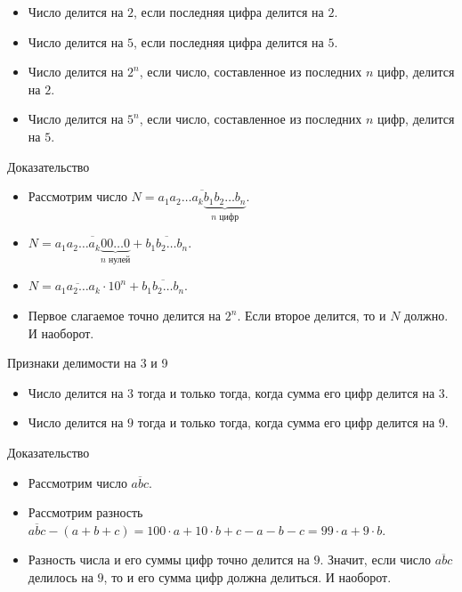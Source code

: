 \documentclass[17pt]{extarticle}
\newcommand{\newslide}[1]{\newpage \begin{center} \large #1 \end{center}}
\begin{document}
\begin{itemize}\itemsep=0mm
\item Число делится на $2$, если последняя цифра делится на $2$.
\item Число делится на $5$, если последняя цифра делится на $5$.
\item Число делится на $2^n$, если число, составленное из последних $n$ цифр, делится на $2$.
\item Число делится на $5^n$, если число, составленное из последних $n$ цифр, делится на $5$.
\end{itemize}

\newslide{Доказательство}\vspace{-7mm}

\begin{itemize}\itemsep=0mm
\item Рассмотрим число $N = \overline{a_1a_2\ldots a_k\underbrace{b_1b_2\ldots b_n}_{n \text{ цифр}}}$.
\item $N = \overline{a_1a_2\ldots a_k\underbrace{00\ldots 0}_{n \text{ нулей}}} + \overline{b_1b_2\ldots b_n}$.
\item $N = \overline{a_1a_2\ldots a_k}\cdot10^n + \overline{b_1b_2\ldots b_n}$.
\item Первое слагаемое точно делится на $2^n$. Если второе делится, то и $N$ должно. И наоборот.
\end{itemize}

\newslide{Признаки делимости на 3 и 9}

\begin{itemize}
\item Число делится на $3$ тогда и только тогда, когда сумма его цифр делится на $3$.
\item Число делится на $9$ тогда и только тогда, когда сумма его цифр делится на $9$.
\end{itemize}

\newslide{Доказательство}

\begin{itemize}
\item Рассмотрим число $\overline{abc}$.
\item Рассмотрим разность $\overline{abc} - (a+b+c) = 100\cdot a + 10\cdot b + c - a-b-c = 99\cdot a + 9\cdot b$.
\item Разность числа и его суммы цифр точно делится на $9$. Значит, если число $\overline{abc}$ делилось на $9$, то и его сумма цифр должна делиться. И наоборот.
\end{itemize}
\end{document}
